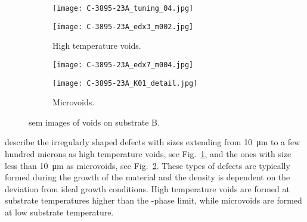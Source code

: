 \begin{figure}[htbp]
    \centering
    \begin{subfigure}[t]{\textwidth}
          \begin{minipage}[t]{0.49\linewidth}
            \centering
            \texttt{[image: C-3895-23A\_tuning\_04.jpg]}
          \end{minipage}
          \hfill
          \begin{minipage}[t]{0.49\linewidth}
            \centering
            \texttt{[image: C-3895-23A\_edx3\_m002.jpg]}
          \end{minipage}
    \caption{High temperature voids.}\label{fig:subBa_high-temperature-voids}
    \end{subfigure}%
    \par\bigskip
    \begin{subfigure}[t]{\textwidth}
          \begin{minipage}[t]{0.49\linewidth}
            \centering
            \texttt{[image: C-3895-23A\_edx7\_m004.jpg]}
          \end{minipage}
          \hfill
          \begin{minipage}[t]{0.49\linewidth}
            \centering
            \texttt{[image: C-3895-23A\_K01\_detail.jpg]}
          \end{minipage}
    \caption{Microvoids.}\label{fig:subBa_microvoids}
    \end{subfigure}%
    \caption[\Ac{sem} images of voids on substrate B.]{\Acf{sem} images of voids on substrate B.}
    \label{fig:SEM_C389523_voids}
\end{figure}

\citet{selvig2007defects} describe the irregularly shaped defects with sizes extending from \SI{10}{\micro\metre} to a few hundred microns as high temperature voids, see Fig.~\ref{fig:subBa_high-temperature-voids}, and the ones with size less than \SI{10}{\micro\metre} as microvoids, see Fig.~\ref{fig:subBa_microvoids}. These types of defects are typically formed during the growth of the material and the density is dependent on the deviation from ideal growth conditions. High temperature voids are formed at substrate temperatures higher than the -phase limit, while microvoids are formed at low substrate temperature.

